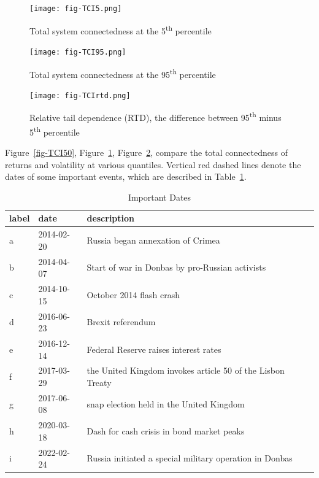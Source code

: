 \documentclass[
  letterpaper,
  DIV=11,
  numbers=noendperiod]{scrartcl}
\begin{document}
\begin{figure}[H]

{\centering \texttt{[image: fig-TCI5.png]}

}

\caption{\label{fig-TCI5}Total system connectedness at the
5\textsuperscript{th} percentile}

\end{figure}

\begin{figure}[H]

{\centering \texttt{[image: fig-TCI95.png]}

}

\caption{\label{fig-TCI95}Total system connectedness at the
95\textsuperscript{th} percentile}

\end{figure}

\begin{figure}[H]

{\centering \texttt{[image: fig-TCIrtd.png]}

}

\caption{\label{fig-TCIrtd}Relative tail dependence (RTD), the
difference between 95\textsuperscript{th} minus 5\textsuperscript{th}
percentile}

\end{figure}

Figure~\ref{fig-TCI50}, Figure~\ref{fig-TCI5}, Figure~\ref{fig-TCI95},
compare the total connectedness of returns and volatility at various
quantiles. Vertical red dashed lines denote the dates of some important
events, which are described in Table~\ref{tbl-dates}.

\hypertarget{tbl-dates}{}
\begin{table}[H]
\caption{\label{tbl-dates}Important Dates }\tabularnewline

\centering
\begin{tabular}[t]{lll}
\toprule
label & date & description\\
\midrule
a & 2014-02-20 & Russia began annexation of Crimea\\
b & 2014-04-07 & Start of war in Donbas by pro-Russian activists\\
c & 2014-10-15 & October 2014 flash crash\\
d & 2016-06-23 & Brexit referendum\\
e & 2016-12-14 & Federal Reserve raises interest rates\\
\addlinespace
f & 2017-03-29 & the United Kingdom invokes article 50 of the Lisbon Treaty\\
g & 2017-06-08 & snap election held in the United Kingdom\\
h & 2020-03-18 & Dash for cash crisis in bond market peaks\\
i & 2022-02-24 & Russia initiated a special military operation in Donbas\\
\bottomrule
\end{tabular}
\end{table}
\end{document}
